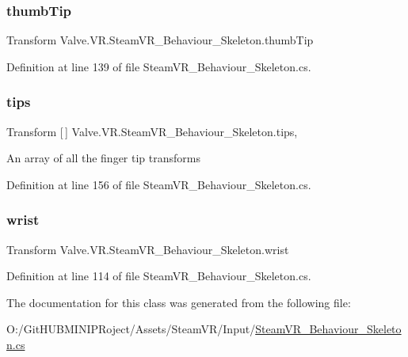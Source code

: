 \subsubsection{\texorpdfstring{thumbTip}{thumbTip}}
{\footnotesize\ttfamily Transform Valve.\+V\+R.\+Steam\+V\+R\+\_\+\+Behaviour\+\_\+\+Skeleton.\+thumb\+Tip\hspace{0.3cm}{\ttfamily [get]}}



Definition at line 139 of file Steam\+V\+R\+\_\+\+Behaviour\+\_\+\+Skeleton.\+cs.

\mbox{\label{class_valve_1_1_v_r_1_1_steam_v_r___behaviour___skeleton_a1fc2692a4f42280318593cc61c04d9b1}} 
\subsubsection{\texorpdfstring{tips}{tips}}
{\footnotesize\ttfamily Transform \mbox{[}$\,$\mbox{]} Valve.\+V\+R.\+Steam\+V\+R\+\_\+\+Behaviour\+\_\+\+Skeleton.\+tips\hspace{0.3cm}{\ttfamily [get]}, {}}



An array of all the finger tip transforms 



Definition at line 156 of file Steam\+V\+R\+\_\+\+Behaviour\+\_\+\+Skeleton.\+cs.

\mbox{\label{class_valve_1_1_v_r_1_1_steam_v_r___behaviour___skeleton_a962d4617aeade1dae3bd6fa5ca0d8fc3}} 
\subsubsection{\texorpdfstring{wrist}{wrist}}
{\footnotesize\ttfamily Transform Valve.\+V\+R.\+Steam\+V\+R\+\_\+\+Behaviour\+\_\+\+Skeleton.\+wrist\hspace{0.3cm}{\ttfamily [get]}}



Definition at line 114 of file Steam\+V\+R\+\_\+\+Behaviour\+\_\+\+Skeleton.\+cs.



The documentation for this class was generated from the following file\+:\begin{DoxyCompactItemize}
\item 
O\+:/\+Git\+H\+U\+B\+M\+I\+N\+I\+P\+Roject/\+Assets/\+Steam\+V\+R/\+Input/\mbox{\hyperlink{_steam_v_r___behaviour___skeleton_8cs}{Steam\+V\+R\+\_\+\+Behaviour\+\_\+\+Skeleton.\+cs}}\end{DoxyCompactItemize}
